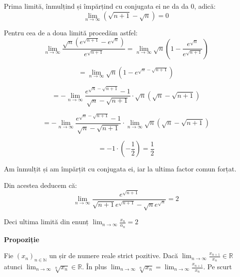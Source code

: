 \documentclass[a4paper,12pt,oneside]{report}
\begin{document}
\begin{enumerate}
Prima limită, înmulțind și împărțind cu conjugata ei ne da da 0, adică:
\begin{displaymath}
  \lim_{n \to \infty }\left ( \sqrt{n+1}-\sqrt{n} \right ) = 0
\end{displaymath}


Pentru cea de a doua limită procedăm astfel:
\begin{displaymath}
  \lim_{n \to \infty }\frac{\sqrt{n}\left ( e^{\sqrt{n+1}} -e^{\sqrt{n}} \right )}{e^{\sqrt{n+1}}}  = \lim_{n \to \infty } \sqrt{n}\left ( 1- \frac{e^{\sqrt{n}}}{e^{\sqrt{n+1}}} \right )
\end{displaymath}

\begin{displaymath}
  =\lim_{n \to \infty }\sqrt{n}\left ( 1-e^{\sqrt{n}-\sqrt{n+1}} \right )
\end{displaymath}

\begin{displaymath}
  = - \lim_{n \to \infty } \frac{e^{\sqrt{n}- \sqrt{n+1}}-1}{\sqrt{n}- \sqrt{n+1}} \cdot \sqrt{n}\left ( \sqrt{n}-\sqrt{n+1} \right )
\end{displaymath}

\begin{displaymath}
  = -\lim_{n \to \infty } \frac{e^{\sqrt{n}- \sqrt{n+1}}-1}{\sqrt{n}- \sqrt{n+1}} \cdot \lim_{n \to \infty }\sqrt{n}\left ( \sqrt{n} -\sqrt{n+1}\right )
\end{displaymath}

\begin{displaymath}
  = -1 \cdot \left ( -\frac{1}{2} \right ) =\frac{1}{2}
\end{displaymath}

Am înmulțit și am împărțit cu conjugata ei, iar la ultima factor comun forțat. 

Din acestea deducem că:
\begin{displaymath}
  \lim_{n \to \infty }\frac{e^{\sqrt{n+1}}}{\sqrt{n+1}e^{\sqrt{n+1}}-\sqrt{n}e^{\sqrt{n}}} = 2
\end{displaymath}


Deci ultima limită din enunț \(\lim_{n \to \infty } \frac{x_{n}}{\alpha _{n}} = 2\)
\end{enumerate}

\textbf{Propoziție} 

Fie \(\left ( x_{n} \right )_{n\in \mathbb{N}}\) un șir de numere reale strict pozitive. Dacă \(\lim_{n \to \infty }\frac{x_{n+1}}{x_{n}}\in \mathbb{R}\) atunci \(\lim_{n \to \infty } \sqrt[n]{x_{n}}\in \mathbb{R}\). În plus \(\lim_{n \to \infty } \sqrt[n]{x_{n}} = \lim_{n \to \infty }\frac{x_{n+1}}{x_{n}}\). 
Pe scurt 
\end{document}
